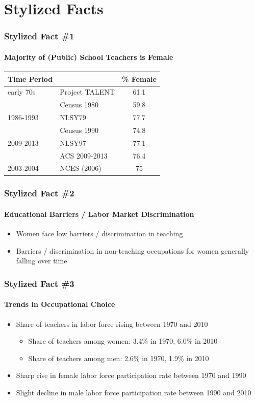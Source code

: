 \documentclass[11pt,hyperref={bookmarks=false},table,aspectratio=169]{beamer}
\begin{document}
 \section{Stylized Facts}
	\begin{frame}
		\frametitle{Stylized Fact \#1}
		\framesubtitle{Majority of (Public) School Teachers is Female}
		\begin{table}[h!]
			\centering 
			\begin{tabular}{l l c }
				\toprule
				Time Period & & \% Female \\
				\midrule
                early 70s & Project TALENT  &  61.1 \\
                & Census 1980 &  59.8 \\
                1986-1993 & NLSY79  & 77.7   \\
                & Census 1990 & 74.8 \\
                2009-2013& NLSY97  & 77.1   \\
                & ACS 2009-2013  & 76.4  \\
				\midrule
				2003-2004 & NCES (2006) & 75\\
				\bottomrule
			\end{tabular}
		\end{table}
	\end{frame}
	
	\begin{frame}
		\frametitle{Stylized Fact \#2}
		\framesubtitle{Educational Barriers / Labor Market Discrimination}
		\begin{itemize}
			\item Women face low barriers / discrimination in teaching
			\item Barriers / discrimination in non-teaching occupations for women generally falling over time
		\end{itemize}
	\end{frame}
	
	\begin{frame}
		\frametitle{Stylized Fact \#3}
		\framesubtitle{Trends in Occupational Choice}
		\begin{itemize}
			\item Share of teachers in labor force rising between 1970 and 2010
			\begin{itemize}
				\item Share of teachers among women: 3.4\% in 1970, 6.0\% in 2010
				\item Share of teachers among men: 2.6\% in 1970, 1.9\% in 2010
			\end{itemize}
			\item Sharp rise in female labor force participation rate between 1970 and 1990
			\item Slight decline in male labor force participation rate between 1990 and 2010
		\end{itemize}
	\end{frame}
	
\end{document}
